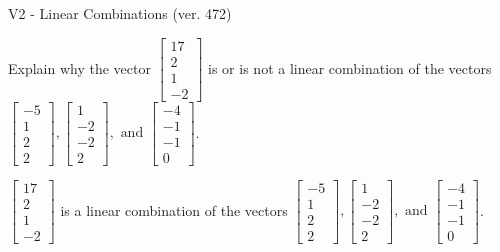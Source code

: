 \begin{exercise}
  \begin{exerciseTitle}V2 - Linear Combinations (ver. 472)\end{exerciseTitle}
  \begin{exerciseStatement}
    Explain why the vector \(\left[\begin{array}{c}
17 \\
2 \\
1 \\
-2
\end{array}\right]\)  is or is not a linear 
	combination of the vectors \(\left[\begin{array}{c}
-5 \\
1 \\
2 \\
2
\end{array}\right] , \left[\begin{array}{c}
1 \\
-2 \\
-2 \\
2
\end{array}\right] , \text{ and } \left[\begin{array}{c}
-4 \\
-1 \\
-1 \\
0
\end{array}\right]\).
	


  \end{exerciseStatement}
  \begin{exerciseAnswer}
   \(\left[\begin{array}{c}
17 \\
2 \\
1 \\
-2
\end{array}\right]\) 
  	 is  
	a linear combination of the vectors \(\left[\begin{array}{c}
-5 \\
1 \\
2 \\
2
\end{array}\right] , \left[\begin{array}{c}
1 \\
-2 \\
-2 \\
2
\end{array}\right] , \text{ and } \left[\begin{array}{c}
-4 \\
-1 \\
-1 \\
0
\end{array}\right]\).

	
  


  \end{exerciseAnswer}
\end{exercise}